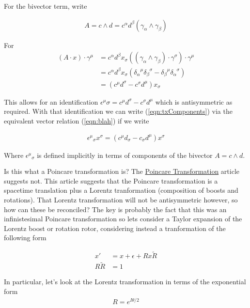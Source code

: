 \documentclass{article}
\begin{document}
For the bivector term, write

\begin{align*}
A = c \wedge d = c^\alpha d^\beta (\gamma_\alpha \wedge \gamma_\beta)
\end{align*}

For
\begin{align*}
(A \cdot x ) \cdot \gamma^\mu 
&=
c^\alpha d^\beta x_\sigma ((\gamma_\alpha \wedge \gamma_\beta) \cdot \gamma^\sigma) \cdot \gamma^\mu \\
&=
c^\alpha d^\beta x_\sigma ( {\delta_\alpha}^\mu {\delta_\beta}^\sigma -{\delta_\beta}^\mu {\delta_\alpha}^\sigma ) \\
&=
(c^\mu d^\sigma -c^\sigma d^\mu ) x_\sigma 
\end{align*}

This allows for an identification $\epsilon^\mu\sigma = c^\mu d^\sigma -c^\sigma d^\mu$ which is antisymmetric as required.
With that identification we can write (\ref{eqn:txComponents}) via the equivalent vector relation (\ref{eqn:blah}) if
we write

\begin{align*}
{\epsilon^\mu}_\sigma x^\sigma = (c^\mu d_\sigma -c_\sigma d^\mu ) x^\sigma 
\end{align*}

Where ${\epsilon^\mu}_\sigma$ is defined implicitly in terms of components of the bivector $A = c \wedge d$.

Is this what a Poincare transformation is?  The \href{http://mathworld.wolfram.com/PoincareTransformation.html}{Poincare Transformation} article suggests not.  This article suggests that the Poincare transformation is a spacetime translation plus
a Lorentz tranformation (composition of boosts and rotations).  That Lorentz transformation will not be antisymmetric
however, so how can these be reconciled?  The key is probably the fact that this was an infinistesimal Poincare transformation
so lets consider a Taylor expansion of the Lorentz boost or rotation rotor, considering instead a tranformation of the 
following form

\begin{align}\label{eqn:foo}
x' &= x + \epsilon + R x \tilde{R} \\
R \tilde{R} &= 1
\end{align}

In particular, let's look at the Lorentz transformation in terms of the exponential form
\begin{align*}
R = e^{I \theta/2}
\end{align*}
\end{document}
